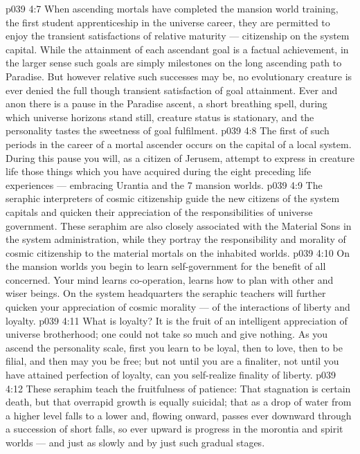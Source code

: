 \vs p039 4:7 \bibnobreakspace {} When ascending mortals have completed the mansion world training, the first student apprenticeship in the universe career, they are permitted to enjoy the transient satisfactions of relative maturity --- citizenship on the system capital. While the attainment of each ascendant goal is a factual achievement, in the larger sense such goals are simply milestones on the long ascending path to Paradise. But however relative such successes may be, no evolutionary creature is ever denied the full though transient satisfaction of goal attainment. Ever and anon there is a pause in the Paradise ascent, a short breathing spell, during which universe horizons stand still, creature status is stationary, and the personality tastes the sweetness of goal fulfilment.
\vs p039 4:8 The first of such periods in the career of a mortal ascender occurs on the capital of a local system. During this pause you will, as a citizen of Jerusem, attempt to express in creature life those things which you have acquired during the eight preceding life experiences --- embracing Urantia and the 7 mansion worlds.
\vs p039 4:9 The seraphic interpreters of cosmic citizenship guide the new citizens of the system capitals and quicken their appreciation of the responsibilities of universe government. These seraphim are also closely associated with the Material Sons in the system administration, while they portray the responsibility and morality of cosmic citizenship to the material mortals on the inhabited worlds.
\vs p039 4:10 \bibnobreakspace {} On the mansion worlds you begin to learn self\hyp{}government for the benefit of all concerned. Your mind learns co\hyp{}operation, learns how to plan with other and wiser beings. On the system headquarters the seraphic teachers will further quicken your appreciation of cosmic morality --- of the interactions of liberty and loyalty.
\vs p039 4:11 What is loyalty? It is the fruit of an intelligent appreciation of universe brotherhood; one could not take so much and give nothing. As you ascend the personality scale, first you learn to be loyal, then to love, then to be filial, and then may you be free; but not until you are a finaliter, not until you have attained perfection of loyalty, can you self\hyp{}realize finality of liberty.
\vs p039 4:12 \pc These seraphim teach the fruitfulness of patience: That stagnation is certain death, but that overrapid growth is equally suicidal; that as a drop of water from a higher level falls to a lower and, flowing onward, passes ever downward through a succession of short falls, so ever upward is progress in the morontia and spirit worlds --- and just as slowly and by just such gradual stages.
